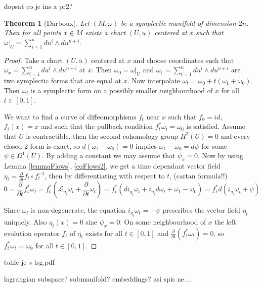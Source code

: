 \documentclass{article}
\newtheorem{theorem}{Theorem}
\theoremstyle{definition}
\begin{document}
dopsat co je ins a pr2?

\begin{theorem}[Darboux]
    Let $(M,\omega)$ be a symplectic manifold of dimension $2n$. Then for all points $x \in M$ exists a chart $(U,u)$ centered at $x$ such that $\omega |_U = \sum_{i=1}^{n} du^i \wedge du^{n+i}$.
\end{theorem}

\begin{proof}
    Take a chart $(U,u)$ centered at $x$ and choose coordinates such that $\omega_x = \sum_{i=1}^{n} du^i \wedge du^{n+i}$ at $x$. Then $\omega_0 = \omega |_U$ and $\omega_1 = \sum_{i=1}^{n} du^i \wedge du^{n+i}$ are two symplectic forms that are equal at $x$. Now interpolate $\omega_t = \omega_0 + t(\omega_1 + \omega_0)$. Then $\omega_t$ is a symplectic form on a possibly smaller neighbourhood of $x$ for all $t \in [0,1]$.

    We want to find a curve of diffeomorphisms $f_t$ near $x$ such that $f_0 = id$, $f_t(x) = x$ and such that the pullback condition $f^*_t \omega_t = \omega_0$ is satisfied. Assume that $U$ is contractible, then the second cohomology group $H^2(U) = 0$ and every closed 2-form is exact, so $d(\omega_1 - \omega_0) = 0$ implies $\omega_1-\omega_0 = d \psi$ for some $\psi \in \Omega^1(U)$. By adding a constant we may assume that $\psi_x = 0$. Now by using Lemma \ref{lemmaFlows}, \eqref{eqFlows2}, we get a time dependant vector field $\eta_t = \frac{\partial}{\partial t}f_t \circ f^{-1}_t$, then by differentiating with respect to $t$, (cartan formula!!)
    \begin{equation*}
        0=\frac{\partial}{\partial t} f_t^* \omega_t=f_t^*\left(\mathcal{L}_{\eta_t} \omega_t+\frac{\partial}{\partial t} \omega_t \right) = f_t^*\left(d i_{\eta_t} \omega_t+i_{\eta_t} d \omega_t+\omega_1-\omega_0\right)=f_t^* d\left(i_{\eta_t}\omega_t + \psi\right)
    \end{equation*}

    Since $\omega_t$ is non-degenerate, the equation $i_{\eta_t}\omega_t = -\psi$ prescribes the vector field $\eta_t$ uniquely. Also $\eta_t(x) = 0$ sine $\psi_x = 0$. On some neighbourhood of $x$ the left evolution operator $f_t$ of $\eta_t$ exists for all $t \in [0,1]$ and $\frac{\partial}{\partial t}(f^*_t\omega_t) = 0$, so $f_t^*\omega_t = \omega_0$ for all $t \in [0,1]$.
\end{proof}

tohle je v lsg.pdf

lagrangian subspace? submanifold? embeddings? asi spis ne....
\end{document}
